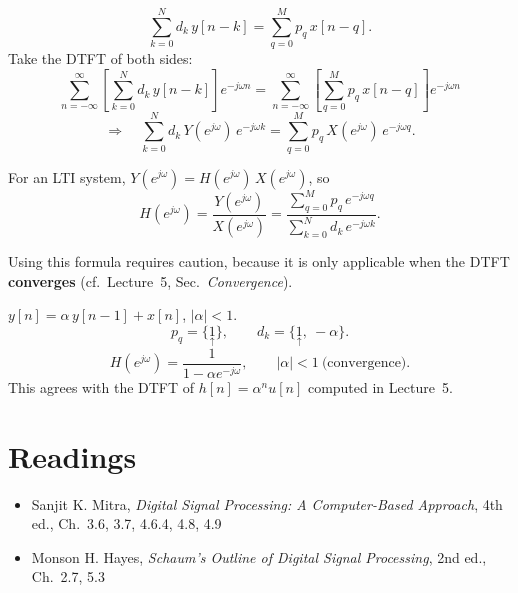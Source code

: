 \documentclass[handout_subfiles_root.tex]{subfiles}
\begin{document}
\begin{equation*}
\sum_{k=0}^{N} d_k\,y[n-k] = \sum_{q=0}^{M} p_q\,x[n-q].
\end{equation*}
Take the DTFT of both sides:
\begin{equation*}
\sum_{n=-\infty}^{\infty}\left[\sum_{k=0}^{N} d_k\,y[n-k]\right]e^{-j\omega n}
= \sum_{n=-\infty}^{\infty}\left[\sum_{q=0}^{M} p_q\,x[n-q]\right]e^{-j\omega n}
\end{equation*}
\begin{equation*}
\Rightarrow\quad \sum_{k=0}^{N} d_k\,Y(e^{j\omega})\,e^{-j\omega k} = \sum_{q=0}^{M} p_q\,X(e^{j\omega})\,e^{-j\omega q}.
\end{equation*}

\begin{factbox}[title={Frequency Response of an LDE}]
For an LTI system, $Y(e^{j\omega}) = H(e^{j\omega})\,X(e^{j\omega})$, so
\begin{equation*}
H(e^{j\omega}) = \frac{Y(e^{j\omega})}{X(e^{j\omega})}
= \frac{\displaystyle\sum_{q=0}^{M} p_q\,e^{-j\omega q}}{\displaystyle\sum_{k=0}^{N} d_k\,e^{-j\omega k}}.
\end{equation*}
\end{factbox}

\begin{notebox}[title={Note}]
Using this formula requires caution, because it is only applicable when the DTFT \textbf{converges} (cf.\ Lecture~5, Sec.~\textit{Convergence}).
\end{notebox}

\begin{examplebox}[title={Example}, handout mark=8]
$y[n] = \alpha\,y[n-1] + x[n]$, $|\alpha|<1$.
\begin{equation*}
p_q = \{\underset{\uparrow}{1}\}, \qquad d_k = \{\underset{\uparrow}{1},\ -\alpha\}.
\end{equation*}
\begin{equation*}
H(e^{j\omega}) = \frac{1}{1-\alpha e^{-j\omega}}, \qquad |\alpha|<1 \ \text{(convergence)}.
\end{equation*}
This agrees with the DTFT of $h[n]=\alpha^n u[n]$ computed in Lecture~5.
\end{examplebox}

\section*{Readings}
\begin{itemize}
  \item Sanjit K. Mitra, \textit{Digital Signal Processing: A Computer-Based Approach}, 4th ed., Ch.\ 3.6, 3.7, 4.6.4, 4.8, 4.9
  \item Monson H. Hayes, \textit{Schaum's Outline of Digital Signal Processing}, 2nd ed., Ch.\ 2.7, 5.3
\end{itemize}

\HandoutAppendixListStart
\HandoutAppendixListEnd

\end{document}
